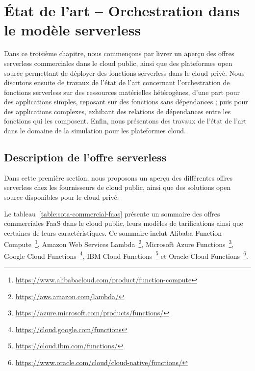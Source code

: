 \chapter{État de l'art -- Orchestration dans le modèle serverless}
\label{chapter:sota}

Dans ce troisième chapitre, nous commençons par livrer un aperçu des offres serverless commerciales dans le cloud public, ainsi que des plateformes open source permettant de déployer des fonctions serverless dans le cloud privé.
Nous discutons ensuite de travaux de l'état de l'art concernant l'orchestration de fonctions serverless sur des ressources matérielles hétérogènes, d'une part pour des applications simples, reposant sur des fonctions sans dépendances ; puis pour des applications complexes, exhibant des relations de dépendances entre les fonctions qui les composent. Enfin, nous présentons des travaux de l'état de l'art dans le domaine de la simulation pour les plateformes cloud.

\section{Description de l'offre serverless}
\label{section:sota-offerings}

Dans cette première section, nous proposons un aperçu des différentes offres serverless chez les fournisseurs de cloud public, ainsi que des solutions open source disponibles pour le cloud privé.

Le tableau~\ref{table:sota-commercial-faas} présente un sommaire des offres commerciales \gls{FaaS} dans le cloud public, leurs modèles de tarifications ainsi que certaines de leurs caractéristiques. Ce sommaire inclut Alibaba Function Compute~\footnote{\label{footnote:alibaba-function}\href{https://www.alibabacloud.com/product/function-compute}{https://www.alibabacloud.com/product/function-compute}}, Amazon Web Services Lambda~\footnote{\label{footnote:aws-lambda}\href{https://aws.amazon.com/lambda/}{https://aws.amazon.com/lambda/}}, Microsoft Azure Functions~\footnote{\label{footnote:azure-functions}\href{https://azure.microsoft.com/products/functions/}{https://azure.microsoft.com/products/functions/}}, Google Cloud Functions~\footnote{\label{footnote:google-functions}\href{https://cloud.google.com/functions}{https://cloud.google.com/functions}}, IBM Cloud Functions~\footnote{\label{footnote:ibm-functions}\href{https://cloud.ibm.com/functions/}{https://cloud.ibm.com/functions/}} et Oracle Cloud Functions~\footnote{\label{footnote:oracle-functions}\href{https://www.oracle.com/cloud/cloud-native/functions/}{https://www.oracle.com/cloud/cloud-native/functions/}}.

